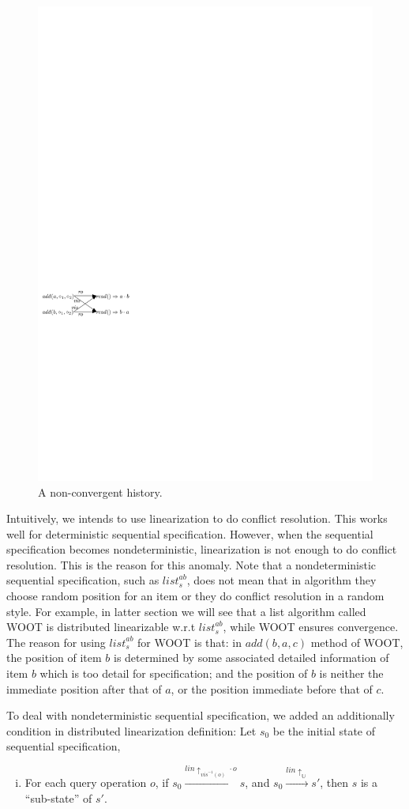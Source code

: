 \begin{figure}[t]
  \centering
  \includegraphics[width=0.4 \textwidth]{figures/PIC-His-list-NonConvergent.pdf}
  \caption{A non-convergent history.}
  \label{fig:a non-convergent history}
\end{figure}



Intuitively, we intends to use linearization to do conflict resolution. This works well for deterministic sequential specification. However, when the sequential specification becomes nondeterministic, linearization is not enough to do conflict resolution. This is the reason for this anomaly. Note that a nondeterministic sequential specification, such as $\mathit{list}_s^{\mathit{ab}}$, does not mean that in algorithm they choose random position for an item or they do conflict resolution in a random style. For example, in latter section we will see that a list algorithm called WOOT is distributed linearizable w.r.t $\mathit{list}_s^{\mathit{ab}}$, while WOOT ensures convergence. The reason for using $\mathit{list}_s^{\mathit{ab}}$ for WOOT is that: in $\mathit{add}(b,a,c)$ method of WOOT, the position of item $b$ is determined by some associated detailed information of item $b$ which is too detail for specification; and the position of $b$ is neither the immediate position after that of $a$, or the position immediate before that of $c$.

To deal with nondeterministic sequential specification, we added an additionally condition in distributed linearization definition: Let $s_0$ be the initial state of sequential specification,

\begin{enumerate}[(i)]
\item For each query operation $o$, if $s_0 {\xrightarrow{ \mathit{lin} \uparrow_{ \mathit{vis}^{-1}(o)  } \cdot o }} s$, and $s_0 {\xrightarrow{ \mathit{lin} \uparrow_{ \mathbb{U} } } } s'$, then $s$ is a ``sub-state'' of $s'$.
\end{enumerate}

